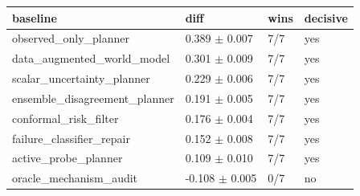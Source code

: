 \begin{tabular}{llll}
\toprule
baseline & diff & wins & decisive \\
\midrule
observed\_only\_planner & 0.389 $\pm$ 0.007 & 7/7 & yes \\
data\_augmented\_world\_model & 0.301 $\pm$ 0.009 & 7/7 & yes \\
scalar\_uncertainty\_planner & 0.229 $\pm$ 0.006 & 7/7 & yes \\
ensemble\_disagreement\_planner & 0.191 $\pm$ 0.005 & 7/7 & yes \\
conformal\_risk\_filter & 0.176 $\pm$ 0.004 & 7/7 & yes \\
failure\_classifier\_repair & 0.152 $\pm$ 0.008 & 7/7 & yes \\
active\_probe\_planner & 0.109 $\pm$ 0.010 & 7/7 & yes \\
oracle\_mechanism\_audit & -0.108 $\pm$ 0.005 & 0/7 & no \\
\bottomrule
\end{tabular}
